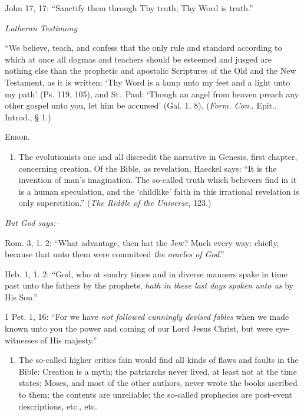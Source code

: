 \documentclass[
]{book}
\providecommand{\tightlist}{%
  \setlength{\itemsep}{0pt}\setlength{\parskip}{0pt}}
\begin{document}
John 17, 17: ``Sanctify them through Thy truth; Thy Word is truth.''

\begin{center}
\textsl{Lutheran Testimony}
\end{center}

``We believe, teach, and confess that the only rule and standard according to which at once all dogmas and teachers should be esteemed and jusged are nothing else than the prophetic and apostolic Scriptures of the Old and the New Testament, as it is written: `Thy Word is a lamp unto my feet and a light unto my path' (Ps. 119, 105), and St.~Paul: `Though an angel from heaven preach any other gospel unto you, let him be accursed' (Gal. 1, 8). (\emph{Form. Con.}, Epit., Introd., § 1.)

\begin{center}
\textsc{Error.}
\end{center}

\begin{enumerate}
\def\labelenumi{\arabic{enumi}.}
\tightlist
\item
  The evolutionists one and all discredit the narrative in Genesis, first chapter, concerning creation. Of the Bible, as revelation, Haeckel says: ``It is the invention of man's imagination. The so-called truth which believers find in it is a human speculation, and the `childlike' faith in this irrational revelation is only superstition.'' (\emph{The Riddle of the Universe}, 123.)
\end{enumerate}

\begin{center}
\textsl{But God says:--}
\end{center}

Rom. 3, 1. 2: ``What advantage, then hat the Jew? Much every way: chiefly, because that unto them were commiteed \emph{the oracles of God}.''

Heb. 1, 1. 2: ``God, who at sundry times and in diverse manners spake in time past unto the fathers by the prophets, \emph{hath in these last days spoken unto us} by His Son.''

1 Pet. 1, 16: ``For we have \emph{not followed cunningly devised fables} when we made known unto you the power and coming of our Lord Jesus Christ, but were eye-witnesses of His majesty.''

\begin{enumerate}
\def\labelenumi{\arabic{enumi}.}
\setcounter{enumi}{1}
\tightlist
\item
  The so-called higher critics fain would find all kinds of flaws and faults in the Bible: Creation is a myth; the patriarchs never lived, at least not at the time states; Moses, and most of the other authors, never wrote the books ascribed to them; the contents are unreliable; the so-called prophecies are post-event descriptions, etc., etc.
\end{enumerate}
\end{document}
